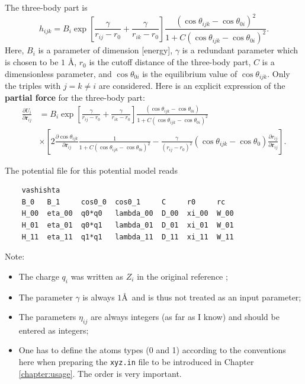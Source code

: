 \documentclass[12pt,a4paper]{report}
\newcommand{\vect}[1]{\boldsymbol{#1}}
\begin{document}
The three-body part is
\begin{equation}
h_{ijk}=B_i
\exp
\left[
\frac{\gamma}{r_{ij}-r_0} + \frac{\gamma}{r_{ik}-r_0}
\right]
\frac{\left(\cos \theta_{ijk} - \cos \theta_{0i} \right)^2}{1 + C \left(\cos \theta_{ijk} - \cos \theta_{0i} \right)^2}.
\end{equation}
Here, $B_i$ is a parameter of dimension [energy], $\gamma$ is a redundant parameter which is chosen to be $1$ \AA, $r_0$ is the cutoff distance of the three-body part, $C$ is a dimensionless parameter, and $\cos \theta_{0i}$ is the equilibrium value of $\cos \theta_{ijk}$. Only the triples with $j= k \neq i$ are considered. Here is an explicit expression of the \textbf{partial force} for the three-body part:
\begin{align}
\frac{\partial U_i}{\partial \vect{r}_{ij}}
&= B_i \exp \left[
 \frac{\gamma}{r_{ij}-r_0} + \frac{\gamma}{r_{ik}-r_0}
\right] \frac{\left(\cos \theta_{ijk} - \cos \theta_{0i} \right)}{1 + C \left(\cos \theta_{ijk} - \cos \theta_{0i} \right)^2} \nonumber \\
&\times
\left[
  2 \frac{\partial \cos \theta_{ijk}} {\partial \vect{r}_{ij}}\frac{1}{1 + C \left(\cos \theta_{ijk} - \cos \theta_{0i} \right)^2} -
  \frac{\gamma}{ \left(r_{ij} - r_0 \right)^2}
  \left(\cos \theta_{ijk} - \cos \theta_{0} \right)
  \frac{\partial r_{ij}} {\partial \vect{r}_{ij}}
\right].
\end{align}

The potential file for this potential model reads
\begin{verbatim}
    vashishta 
    B_0   B_1     cos0_0  cos0_1     C     r0     rc
    H_00  eta_00  q0*q0   lambda_00  D_00  xi_00  W_00
    H_01  eta_01  q0*q1   lambda_01  D_01  xi_01  W_01
    H_11  eta_11  q1*q1   lambda_11  D_11  xi_11  W_11
\end{verbatim}
Note:
\begin{itemize}
\item The charge $q_i$ was written as $Z_i$ in the original reference \cite{vashishta2007jap};
\item The parameter $\gamma$ is always $1$\AA~and is thus not treated as an input parameter;
\item The parameters $\eta_{ij}$ are always integers (as far as I know) and should be entered as integers;
\item One has to define the atoms types (0 and 1) according to the conventions here when preparing the \verb"xyz.in" file to be introduced in Chapter \ref{chapter:usage}. The order is very important.
\end{itemize}
\end{document}
